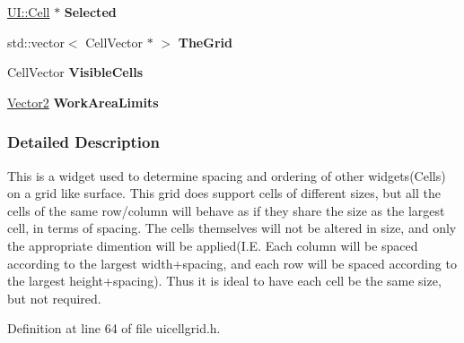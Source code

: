 \begin{DoxyCompactItemize}
\item 
\hypertarget{classphys_1_1UI_1_1CellGrid_ae5864a7174fee981647f339075a11e10}{
\hyperlink{classphys_1_1UI_1_1Cell}{UI::Cell} $\ast$ {\bfseries Selected}}
\label{classphys_1_1UI_1_1CellGrid_ae5864a7174fee981647f339075a11e10}

\item 
\hypertarget{classphys_1_1UI_1_1CellGrid_a38f49946396c1d3f1f34edb3e9bf4297}{
std::vector$<$ CellVector $\ast$ $>$ {\bfseries TheGrid}}
\label{classphys_1_1UI_1_1CellGrid_a38f49946396c1d3f1f34edb3e9bf4297}

\item 
\hypertarget{classphys_1_1UI_1_1CellGrid_a7fcb9ac98852926abf686df661acc72d}{
CellVector {\bfseries VisibleCells}}
\label{classphys_1_1UI_1_1CellGrid_a7fcb9ac98852926abf686df661acc72d}

\item 
\hypertarget{classphys_1_1UI_1_1CellGrid_a13d9fb5036b9e47fe04614079ca0f801}{
\hyperlink{classphys_1_1Vector2}{Vector2} {\bfseries WorkAreaLimits}}
\label{classphys_1_1UI_1_1CellGrid_a13d9fb5036b9e47fe04614079ca0f801}

\end{DoxyCompactItemize}


\subsubsection{Detailed Description}
This is a widget used to determine spacing and ordering of other widgets(Cells) on a grid like surface. This grid does support cells of different sizes, but all the cells of the same row/column will behave as if they share the size as the largest cell, in terms of spacing. The cells themselves will not be altered in size, and only the appropriate dimention will be applied(I.E. Each column will be spaced according to the largest width+spacing, and each row will be spaced according to the largest height+spacing). Thus it is ideal to have each cell be the same size, but not required. 

Definition at line 64 of file uicellgrid.h.



